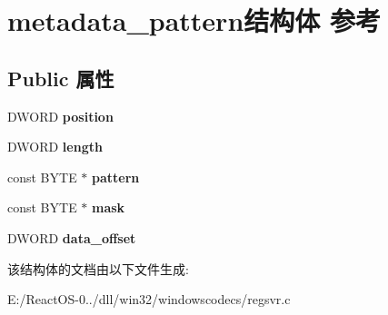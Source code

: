 \hypertarget{structmetadata__pattern}{}\section{metadata\+\_\+pattern结构体 参考}
\label{structmetadata__pattern}
\subsection*{Public 属性}
\begin{DoxyCompactItemize}
\item 
\mbox{\label{structmetadata__pattern_a007b0c675b2e22f359bc6d198fb27dd3}} 
D\+W\+O\+RD {\bfseries position}
\item 
\mbox{\label{structmetadata__pattern_a14867a2e3d0f6a820b2ec8f093a51015}} 
D\+W\+O\+RD {\bfseries length}
\item 
\mbox{\label{structmetadata__pattern_a86824390fa168383269b327d61a13bef}} 
const B\+Y\+TE $\ast$ {\bfseries pattern}
\item 
\mbox{\label{structmetadata__pattern_a28590159aa3eefcbfd436c5aa58c3e11}} 
const B\+Y\+TE $\ast$ {\bfseries mask}
\item 
\mbox{\label{structmetadata__pattern_a893c1ba29821f015523b270c53b71216}} 
D\+W\+O\+RD {\bfseries data\+\_\+offset}
\end{DoxyCompactItemize}


该结构体的文档由以下文件生成\+:\begin{DoxyCompactItemize}
\item 
E\+:/\+React\+O\+S-\/0../dll/win32/windowscodecs/regsvr.\+c\end{DoxyCompactItemize}
